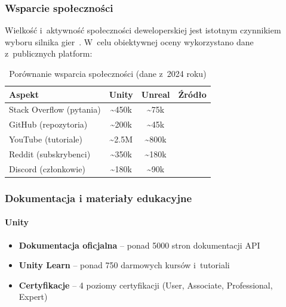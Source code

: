 \subsubsection{Wsparcie społeczności}

Wielkość i~aktywność społeczności deweloperskiej jest istotnym czynnikiem wyboru silnika gier~\cite{christopoulou2017overview}. W~celu obiektywnej oceny wykorzystano dane z~publicznych platform:

\begin{table}[h!]
    \centering
    \caption{Porównanie wsparcia społeczności (dane z~2024 roku)}
    \label{tab:community}
    \begin{tabular}{|l|c|c|c|}
        \hline
        \textbf{Aspekt} & \textbf{Unity} & \textbf{Unreal} & \textbf{Źródło} \\
        \hline\hline
        Stack Overflow (pytania) & \textasciitilde450k & \textasciitilde75k & \cite{christopoulou2017overview} \\
        \hline
        GitHub (repozytoria) & \textasciitilde200k & \textasciitilde45k & \cite{vohera2021game} \\
        \hline
        YouTube (tutoriale) & \textasciitilde2.5M & \textasciitilde800k & \cite{christopoulou2017overview} \\
        \hline
        Reddit (subskrybenci) & \textasciitilde350k & \textasciitilde180k & \cite{barczak2019comparative} \\
        \hline
        Discord (członkowie) & \textasciitilde180k & \textasciitilde90k & \cite{barczak2019comparative} \\
        \hline
    \end{tabular}
\end{table}

\subsubsection{Dokumentacja i materiały edukacyjne}

\paragraph{Unity}
\begin{itemize}
    \item \textbf{Dokumentacja oficjalna} -- ponad 5000 stron dokumentacji API~\cite{unity_urp_docs}
    \item \textbf{Unity Learn} -- ponad 750 darmowych kursów i~tutoriali~\cite{christopoulou2017overview}
    \item \textbf{Certyfikacje} -- 4 poziomy certyfikacji (User, Associate, Professional, Expert)~\cite{barczak2019comparative}
\end{itemize}


